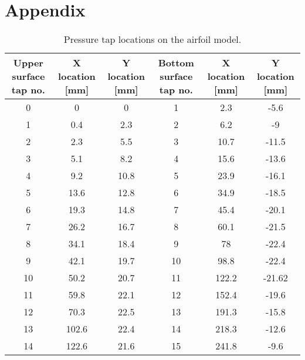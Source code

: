 \documentclass[fleqn,10pt]{SelfArx} %
\begin{document}
\section{Appendix}
\begin{table}[hbt]
\caption{Pressure tap locations on the airfoil model.}
\centering
\begin{tabular}{|ccc|ccc|}
\hline
Upper surface tap no. & X location [mm] & Y location [mm] & Bottom surface tap no. & X location  [mm]& Y location  [mm]\\
\hline \hline
0                     & 0          & 0          & 1                      & 2.3        & -5.6       \\
1                     & 0.4        & 2.3        & 2                      & 6.2        & -9         \\
2                     & 2.3        & 5.5        & 3                      & 10.7       & -11.5      \\
3                     & 5.1        & 8.2        & 4                      & 15.6       & -13.6      \\
4                     & 9.2        & 10.8       & 5                      & 23.9       & -16.1      \\
5                     & 13.6       & 12.8       & 6                      & 34.9       & -18.5      \\
6                     & 19.3       & 14.8       & 7                      & 45.4       & -20.1      \\
7                     & 26.2       & 16.7       & 8                      & 60.1       & -21.5      \\
8                     & 34.1       & 18.4       & 9                      & 78         & -22.4      \\
9                     & 42.1       & 19.7       & 10                     & 98.8       & -22.4      \\
10                    & 50.2       & 20.7       & 11                     & 122.2      & -21.62     \\
11                    & 59.8       & 22.1       & 12                     & 152.4      & -19.6      \\
12                    & 70.3       & 22.5       & 13                     & 191.3      & -15.8      \\
13                    & 102.6      & 22.4       & 14                     & 218.3      & -12.6      \\
14                    & 122.6      & 21.6       & 15                     & 241.8      & -9.6       \\

\end{tabular}
\end{table}
\end{document}
